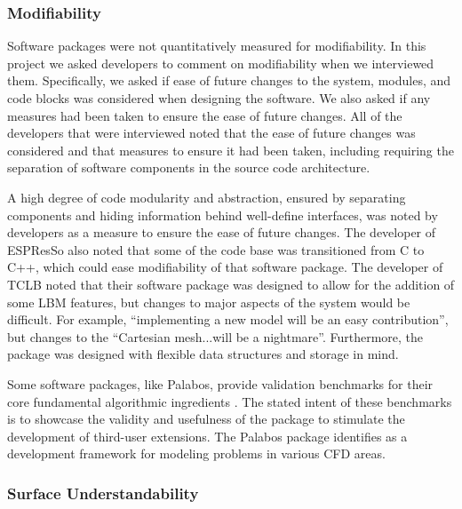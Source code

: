 \documentclass[12pt, notitlepage]{article}
\begin{document}
\subsubsection{Modifiability}

Software packages were not quantitatively measured for modifiability.
In this project we asked developers to comment on modifiability when we interviewed them. Specifically, we asked if ease of future changes to the system, modules, and code blocks was considered when designing the software. We also asked if any measures had been taken to ensure the ease of future changes. 
All of the developers that were interviewed noted that the ease of future changes was considered and that measures to ensure it had been taken, including
requiring the separation of software components in the source code architecture.

A high degree of code modularity and abstraction, ensured by separating components and hiding information behind well-define interfaces, was noted by developers as a measure to ensure the ease of future changes. The developer of ESPResSo also noted that some of the code base was transitioned from C to C++, which could ease modifiability of that software package. The developer of TCLB noted that their software package was designed to allow for the addition of some LBM features, but changes to major aspects of the system would be difficult. For example, ``implementing a new model will be an easy contribution'', but changes to the ``Cartesian mesh...will be a nightmare''. Furthermore, the package was designed with flexible data structures and storage in mind. 

Some software packages, like Palabos, provide validation benchmarks for their core fundamental algorithmic ingredients \citep{latt2021palabos}. The stated intent of these benchmarks is to showcase the validity and usefulness of the package to stimulate the development of third-user extensions. The Palabos package identifies as a development framework for modeling problems in various CFD areas. 

\subsubsection{Surface Understandability}
\end{document}
